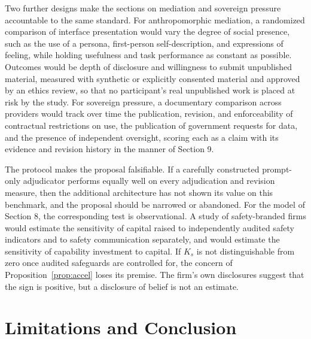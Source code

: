 \documentclass[12pt]{article}
\theoremstyle{definition}
\theoremstyle{remark}
\begin{document}
Two further designs make the sections on mediation and sovereign pressure accountable to the same standard. For anthropomorphic mediation, a randomized comparison of interface presentation would vary the degree of social presence, such as the use of a persona, first-person self-description, and expressions of feeling, while holding usefulness and task performance as constant as possible. Outcomes would be depth of disclosure and willingness to submit unpublished material, measured with synthetic or explicitly consented material and approved by an ethics review, so that no participant's real unpublished work is placed at risk by the study. For sovereign pressure, a documentary comparison across providers would track over time the publication, revision, and enforceability of contractual restrictions on use, the publication of government requests for data, and the presence of independent oversight, scoring each as a claim with its evidence and revision history in the manner of Section 9.

The protocol makes the proposal falsifiable. If a carefully constructed prompt-only adjudicator performs equally well on every adjudication and revision measure, then the additional architecture has not shown its value on this benchmark, and the proposal should be narrowed or abandoned. For the model of Section 8, the corresponding test is observational. A study of safety-branded firms would estimate the sensitivity of capital raised to independently audited safety indicators and to safety communication separately, and would estimate the sensitivity of capability investment to capital. If $K_s$ is not distinguishable from zero once audited safeguards are controlled for, the concern of Proposition~\ref{prop:accel} loses its premise. The firm's own disclosures suggest that the sign is positive, but a disclosure of belief is not an estimate.

\section{Limitations and Conclusion}
\end{document}
